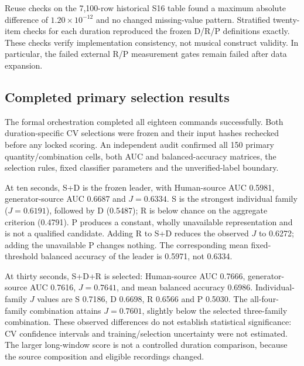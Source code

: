 Reuse checks on the 7,100-row historical S16 table found a maximum absolute
difference of $1.20\times10^{-12}$ and no changed missing-value pattern.
Stratified twenty-item checks for each duration reproduced the frozen D/R/P
definitions exactly. These checks verify implementation consistency, not musical
construct validity. In particular, the failed external R/P measurement gates
remain failed after data expansion.

\subsection{Completed primary selection results}

The formal orchestration completed all eighteen commands successfully. Both
duration-specific CV selections were frozen and their input hashes rechecked
before any locked scoring. An independent audit confirmed all 150 primary
quantity/combination cells, both AUC and balanced-accuracy matrices, the selection
rules, fixed classifier parameters and the unverified-label boundary.

At ten seconds, S+D is the frozen leader, with Human-source AUC 0.5981,
generator-source AUC 0.6687 and $J=0.6334$. S is the strongest individual family
($J=0.6191$), followed by D (0.5487); R is below chance on the aggregate criterion
(0.4791). P produces a constant, wholly unavailable representation and is not a
qualified candidate. Adding R to S+D reduces the observed $J$ to 0.6272; adding
the unavailable P changes nothing. The corresponding mean fixed-threshold
balanced accuracy of the leader is 0.5971, not 0.6334.

At thirty seconds, S+D+R is selected: Human-source AUC 0.7666,
generator-source AUC 0.7616, $J=0.7641$, and mean balanced accuracy 0.6986.
Individual-family $J$ values are S 0.7186, D 0.6698, R 0.6566 and P 0.5030.
The all-four-family combination attains $J=0.7601$, slightly below the selected three-family
combination. These observed differences do not establish statistical significance:
CV confidence intervals and training/selection uncertainty were not estimated.
The larger long-window score is not a controlled duration comparison, because
the source composition and eligible recordings changed.

\begin{table}[htbp]
\centering\small\setlength{\tabcolsep}{4pt}
\caption{Ten-second all-data selection and individual-family results.}

\end{table}
\begin{table}[htbp]
\centering\small\setlength{\tabcolsep}{4pt}
\caption{Thirty-second all-data selection and individual-family results.}

\end{table}

